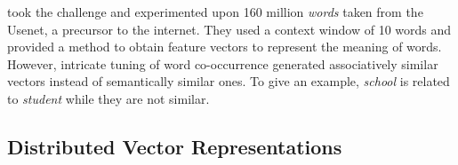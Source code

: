 \textcite{lund_producing_1996} took the challenge and experimented upon 160 million \emph{words} taken from the Usenet, a precursor to the internet.
They used a context window of 10 words and provided a method to obtain feature vectors to represent the meaning of words.
However, intricate tuning of word co-occurrence generated associatively similar vectors instead of semantically similar ones.
To give an example, \emph{school} is related to \emph{student} while they are not similar.

\subsection{Distributed Vector Representations}%
\label{sub:distributed_vector_representations}


